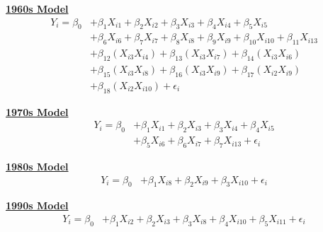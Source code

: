 \documentclass[11pt]{article}
\begin{document}
\textbf{\underline{1960s Model}}
\begin{equation}
\begin{aligned}
    Y_i = \beta_0 & + \beta_1 X_{i1} + \beta_2 X_{i2} + \beta_3 X_{i3} + \beta_4 X_{i4} + \beta_5 X_{i5} \\
                  & + \beta_6 X_{i6} + \beta_7 X_{i7} + \beta_8 X_{i8} + \beta_9 X_{i9} + \beta_{10} X_{i10} + \beta_{11} X_{i13} \\
                  & + \beta_{12} (X_{i3}X_{i4}) + \beta_{13} (X_{i3}X_{i7}) + \beta_{14} (X_{i3}X_{i6}) \\
                  & + \beta_{15} (X_{i3}X_{i8}) + \beta_{16} (X_{i3}X_{i9}) + \beta_{17} (X_{i2}X_{i9}) \\
                  & + \beta_{18} (X_{i2}X_{i10}) + \epsilon_i
\end{aligned}
\label{eq:60s_model}
\end{equation}

\textbf{\underline{1970s Model}}
\begin{equation}
\begin{aligned}
    Y_i = \beta_0 & + \beta_1 X_{i1} + \beta_2 X_{i3} + \beta_3 X_{i4} + \beta_4 X_{i5} \\
                  & + \beta_5 X_{i6} + \beta_6 X_{i7} + \beta_{7} X_{i13} + \epsilon_i
\end{aligned}
\label{eq:70s_model}
\end{equation}

\textbf{\underline{1980s Model}}
\begin{equation}
\begin{aligned}
    Y_i = \beta_0 & + \beta_1 X_{i8} + \beta_2 X_{i9} + \beta_3 X_{i10} + \epsilon_i
\end{aligned}
\label{eq:80s_model}
\end{equation}

\textbf{\underline{1990s Model}}
\begin{equation}
\begin{aligned}
    Y_i = \beta_0 & + \beta_1 X_{i2} + \beta_2 X_{i3} + \beta_3 X_{i8} + \beta_4 X_{i10} + \beta_{5} X_{i11} + \epsilon_i
\end{aligned}
\label{eq:90s_model}
\end{equation}
\end{document}
